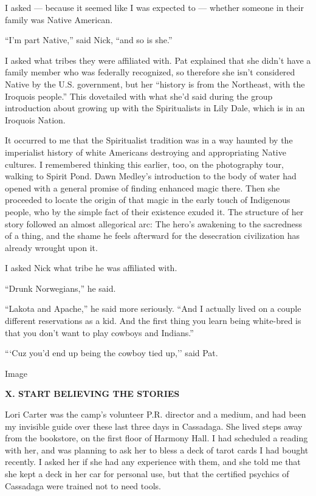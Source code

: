 I asked --- because it seemed like I was expected to --- whether someone
in their family was Native American.

``I'm part Native,'' said Nick, ``and so is she.''

I asked what tribes they were affiliated with. Pat explained that she
didn't have a family member who was federally recognized, so therefore
she isn't considered Native by the U.S. government, but her ``history is
from the Northeast, with the Iroquois people.'' This dovetailed with
what she'd said during the group introduction about growing up with the
Spiritualists in Lily Dale, which is in an Iroquois Nation.

It occurred to me that the Spiritualist tradition was in a way haunted
by the imperialist history of white Americans destroying and
appropriating Native cultures. I remembered thinking this earlier, too,
on the photography tour, walking to Spirit Pond. Dawn Medley's
introduction to the body of water had opened with a general promise of
finding enhanced magic there. Then she proceeded to locate the origin of
that magic in the early touch of Indigenous people, who by the simple
fact of their existence exuded it. The structure of her story followed
an almost allegorical arc: The hero's awakening to the sacredness of a
thing, and the shame he feels afterward for the desecration civilization
has already wrought upon it.

I asked Nick what tribe he was affiliated with.

``Drunk Norwegians,'' he said.

``Lakota and Apache,'' he said more seriously. ``And I actually lived on
a couple different reservations as a kid. And the first thing you learn
being white-bred is that you don't want to play cowboys and Indians.''

```Cuz you'd end up being the cowboy tied up,'' said Pat.

Image

\textbf{X. START BELIEVING THE STORIES}

Lori Carter was the camp's volunteer P.R. director and a medium, and had
been my invisible guide over these last three days in Cassadaga. She
lived steps away from the bookstore, on the first floor of Harmony Hall.
I had scheduled a reading with her, and was planning to ask her to bless
a deck of tarot cards I had bought recently. I asked her if she had any
experience with them, and she told me that she kept a deck in her car
for personal use, but that the certified psychics of Cassadaga were
trained not to need tools.

